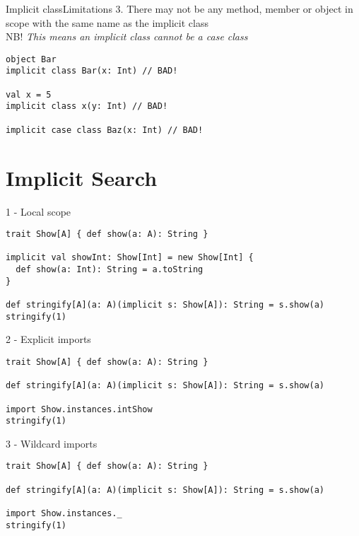 \documentclass[aspectratio=169]{beamer}
\begin{document}
\begin{frame}[fragile]{Implicit class}{Limitations}
3. There may not be any method, member or object in scope with the same name as the implicit
class\\[1em]
\alert{NB!} \textit{This means an implicit class cannot be a case class}
\bigskip
\begin{verbatim}
object Bar
implicit class Bar(x: Int) // BAD!

val x = 5
implicit class x(y: Int) // BAD!

implicit case class Baz(x: Int) // BAD!
\end{verbatim}
\end{frame}

\section{Implicit Search}

\begin{frame}[fragile]{1 - Local scope}
\bigskip
\begin{verbatim}
trait Show[A] { def show(a: A): String }

implicit val showInt: Show[Int] = new Show[Int] {
  def show(a: Int): String = a.toString
}

def stringify[A](a: A)(implicit s: Show[A]): String = s.show(a)
stringify(1)
\end{verbatim}
\end{frame}

\begin{frame}[fragile]{2 - Explicit imports}
\bigskip
\begin{verbatim}
trait Show[A] { def show(a: A): String }

def stringify[A](a: A)(implicit s: Show[A]): String = s.show(a)

import Show.instances.intShow
stringify(1)
\end{verbatim}
\end{frame}

\begin{frame}[fragile]{3 - Wildcard imports}
\bigskip
\begin{verbatim}
trait Show[A] { def show(a: A): String }

def stringify[A](a: A)(implicit s: Show[A]): String = s.show(a)

import Show.instances._
stringify(1)
\end{verbatim}
\end{frame}
\end{document}
